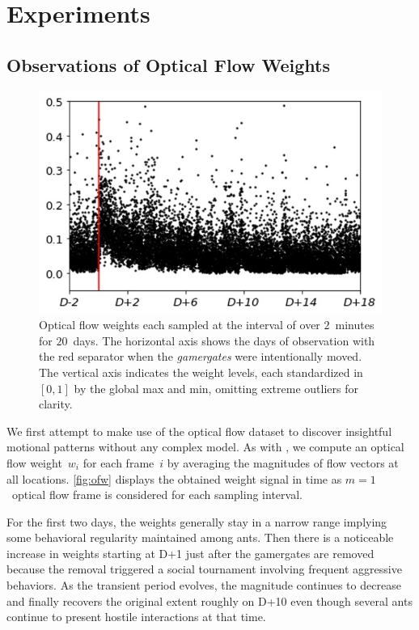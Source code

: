 \documentclass[letterpaper]{article} %
\let\orgautoref\autoref
\providecommand{\Autoref}
{\def\equationautorefname{Equation}%
	\def\figureautorefname{Figure}%
	\def\subfigureautorefname{Figure}%
	\def\Itemautorefname{Item}%
	\def\tableautorefname{Table}%
	\def\exerciseautorefname{Exercise}%
	\def\starexerciseautorefname{Exercise}%
	\def\sectionautorefname{Section}%
	\def\subsectionautorefname{Section}%
	\def\subsubsectionautorefname{Section}%
	\def\chapterautorefname{Section}%
	\def\partautorefname{Part}%
	\orgautoref}
\renewcommand{\autoref}
{\def\equationautorefname{Equation}%
	\def\figureautorefname{Fig.}%
	\def\subfigureautorefname{Fig.}%
	\def\Itemautorefname{item}%
	\def\tableautorefname{Table}%
	\def\exerciseautorefname{Exercise}%
	\def\starexerciseautorefname{Exercise}%
	\def\sectionautorefname{Section}%
	\def\subsectionautorefname{Section}%
	\def\subsubsectionautorefname{Section}%
	\def\chapterautorefname{Section}%
	\def\partautorefname{Part}%
	\orgautoref}
\begin{document}
\section{Experiments}
\label{sec:experiments}


\subsection{Observations of Optical Flow Weights}
\label{sec:obs_optical_flow_weights}

\begin{figure}[t]
	\centering
	\includegraphics[width=.7\columnwidth]{ofw}
	\caption{
		Optical flow weights each sampled at the interval of
		over $2$~minutes for $20$~days.
		The horizontal axis shows the days of observation
		with the red separator
		when the \emph{gamergates} were intentionally moved.
		The vertical axis indicates the weight levels, each
		standardized in $[0, 1]$ by the global max and
		min, omitting extreme outliers for clarity.
	}
	\label{fig:ofw}
\end{figure}
We first attempt to make use of the optical flow dataset to discover
insightful motional patterns without any complex model. As with
\citet{MCFT13}, we compute an optical flow weight~$w_i$ for each
frame~$i$ by averaging the magnitudes of flow vectors at all locations.
\Autoref{fig:ofw} displays the obtained weight signal in time as
$m=1$~optical flow frame is considered for each sampling interval.

For the first two days, the weights generally stay in a narrow range
implying some behavioral regularity maintained among ants. Then there is
a noticeable increase in weights starting at D+1 just after the gamergates
are removed because the removal triggered a social
tournament involving frequent aggressive behaviors. As the
transient period evolves, the magnitude continues to decrease and
finally recovers the original extent roughly on D+10 even though
several ants continue to present hostile interactions at that time.
\end{document}
